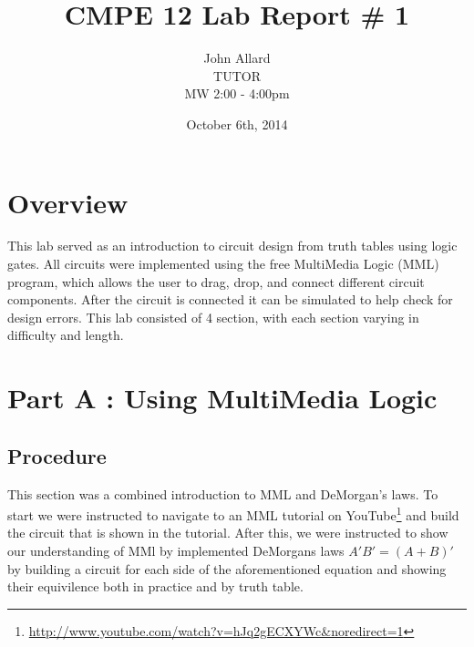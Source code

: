 \documentclass[a4paper,11pt]{article}
\title{ CMPE 12 Lab Report \# 1 \\[7 in]}
\author{John Allard \\ TUTOR \\ MW 2:00 - 4:00pm}
\date{October 6th, 2014}
\begin{document}
\maketitle
\newpage

\section{Overview}
This lab served as an introduction to circuit design from truth tables using logic gates. All circuits were implemented using the free MultiMedia Logic (MML) program, which allows the user to drag, drop, and connect different circuit components. After the circuit is connected it can be simulated to help check for design errors. This lab consisted of 4 section, with each section varying in difficulty and length. 

\section{Part A : Using MultiMedia Logic}
\subsection{Procedure}
This section was a combined introduction to MML and DeMorgan's laws. To start we were instructed to navigate to an MML tutorial on YouTube\footnote{\url{http://www.youtube.com/watch?v=hJq2gECXYWc&noredirect=1}} and build the circuit that is shown in the tutorial. After this, we were instructed to show our understanding of MMl by implemented DeMorgans laws \(A'B' = (A+B)'\) by building a circuit for each side of the aforementioned equation and showing their equivilence both in practice and by truth table. 
\end{document}

